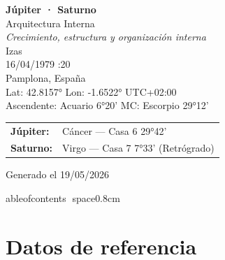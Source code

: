 \documentclass[11pt,a4paper]{article}
\begin{document}

\begin{titlepage}
\centering

\vspace*{2cm}

{\Huge\bfseries\color{azulai} Júpiter · Saturno}\\[0.4cm]

{\large\color{grisai} Arquitectura Interna}\\[0.25cm]

{\small\itshape\color{grisai}
Crecimiento, estructura y organización interna
}\\[1.8cm]

{\huge\color{doradoai} Izas}\\[1.2cm]

{\Large 16/04/1979 :20}\\[0.25cm]

{\Large Pamplona, España}\\[0.25cm]

{\normalsize
Lat: 42.8157° \quad
Lon: -1.6522° \quad
UTC+02:00
}\\[0.4cm]

{\normalsize
Ascendente: Acuario 6°20'
\quad
MC: Escorpio 29°12'
}\\[1.6cm]

\begin{tabular}{ll}
\textbf{Júpiter:} & Cáncer — Casa 6 29°42' \\
\textbf{Saturno:} & Virgo — Casa 7 7°33' (Retrógrado) \\
\end{tabular}

\vfill

{\small\color{grisai}
Generado el 19/05/2026
}

\end{titlepage}

	ableofcontents
space{0.8cm}


\section{Datos de referencia}
\end{document}
